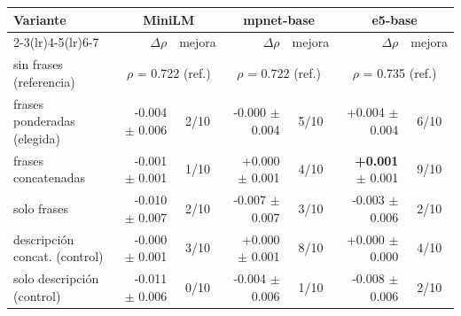 \begin{tabular}{lrcrcrc}
\toprule
Variante & \multicolumn{2}{c}{MiniLM} & \multicolumn{2}{c}{mpnet-base} & \multicolumn{2}{c}{e5-base} \\
\cmidrule(lr){2-3}\cmidrule(lr){4-5}\cmidrule(lr){6-7}
 & $\Delta\rho$ & mejora & $\Delta\rho$ & mejora & $\Delta\rho$ & mejora \\
\midrule
sin frases (referencia) & \multicolumn{2}{c}{$\rho$ = 0.722 (ref.)} & \multicolumn{2}{c}{$\rho$ = 0.722 (ref.)} & \multicolumn{2}{c}{$\rho$ = 0.735 (ref.)} \\
frases ponderadas (elegida) & -0.004 $\pm$ 0.006 & 2/10 & -0.000 $\pm$ 0.004 & 5/10 & +0.004 $\pm$ 0.004 & 6/10 \\
frases concatenadas & -0.001 $\pm$ 0.001 & 1/10 & +0.000 $\pm$ 0.001 & 4/10 & \textbf{+0.001} $\pm$ 0.001 & 9/10 \\
solo frases & -0.010 $\pm$ 0.007 & 2/10 & -0.007 $\pm$ 0.007 & 3/10 & -0.003 $\pm$ 0.006 & 2/10 \\
descripción concat. (control) & -0.000 $\pm$ 0.001 & 3/10 & +0.000 $\pm$ 0.001 & 8/10 & +0.000 $\pm$ 0.000 & 4/10 \\
solo descripción (control) & -0.011 $\pm$ 0.006 & 0/10 & -0.004 $\pm$ 0.006 & 1/10 & -0.008 $\pm$ 0.006 & 2/10 \\
\bottomrule
\end{tabular}
